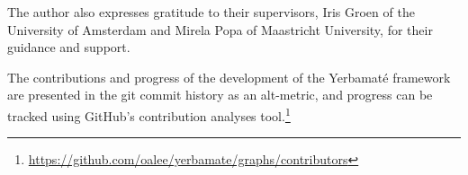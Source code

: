 The author also expresses gratitude to their supervisors, Iris Groen of the University of Amsterdam and Mirela Popa of Maastricht University, for their guidance and support. 

The contributions and progress of the development of the Yerbamaté framework are presented in the git commit history as an alt-metric, and progress can be tracked using GitHub's contribution analyses tool.\footnote{\url{https://github.com/oalee/yerbamate/graphs/contributors}}




